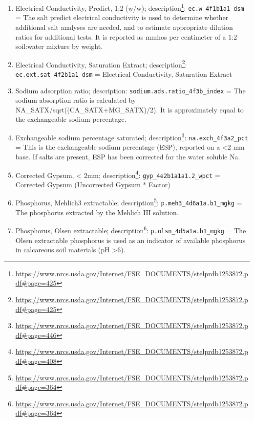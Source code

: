 \documentclass[
  graybox,natbib,nospthms]{svmono}
\renewcommand{\href}[2]{#2 (\url{#1})}
\renewcommand{\href}[2]{#2\footnote{\url{#1}}}
\begin{document}
\begin{enumerate}
  Soil pH 1:2 0.01-M calcium choride; \href{https://www.nrcs.usda.gov/Internet/FSE_DOCUMENTS/stelprdb1253872.pdf\#page=304}{description}: \texttt{ph.cacl2\_4c1a2a2a.b1\_index} = The pH, 1:2 soil-CaCl2 is the pH of a sample measured in 0.01M CaCl2 at a 1:2 soil:solution ratio.\\
\item
  Electrical Conductivity, Predict, 1:2 (w/w); \href{https://www.nrcs.usda.gov/Internet/FSE_DOCUMENTS/stelprdb1253872.pdf\#page=425}{description}: \texttt{ec.w\_4f1b1a1\_dsm} = The salt predict electrical conductivity is used to determine whether additional salt analyses are needed, and to estimate appropriate dilution ratios for additional tests. It is reported as mmhos per centimeter of a 1:2 soil:water mixture by weight.\\
\item
  Electrical Conductivity, Saturation Extract; \href{https://www.nrcs.usda.gov/Internet/FSE_DOCUMENTS/stelprdb1253872.pdf\#page=425}{description}: \texttt{ec.ext.sat\_4f2b1a1\_dsm} = Electrical Conductivity, Saturation Extract
\item
  Sodium adsorption ratio; description: \texttt{sodium.ads.ratio\_4f3b\_index} = The sodium absorption ratio is calculated by NA\_SATX/sqrt((CA\_SATX+MG\_SATX)/2). It is approximately equal to the exchangeable sodium percentage.\\
\item
  Exchangeable sodium percentage saturated; \href{https://www.nrcs.usda.gov/Internet/FSE_DOCUMENTS/stelprdb1253872.pdf\#page=446}{description}: \texttt{na.exch\_4f3a2\_pct} = This is the exchangeable sodium percentage (ESP), reported on a \textless2 mm base. If salts are present, ESP has been corrected for the water soluble Na.\\
\item
  Corrected Gypsum, \textless{} 2mm; \href{https://www.nrcs.usda.gov/Internet/FSE_DOCUMENTS/stelprdb1253872.pdf\#page=408}{description}: \texttt{gyp\_4e2b1a1a1.2\_wpct} = Corrected Gypsum (Uncorrected Gypsum * Factor)\\
\item
  Phosphorus, Mehlich3 extractable; \href{https://www.nrcs.usda.gov/Internet/FSE_DOCUMENTS/stelprdb1253872.pdf\#page=364}{description}: \texttt{p.meh3\_4d6a1a.b1\_mgkg} = The phosphorus extracted by the Mehlich III solution.\\
\item
  Phosphorus, Olsen extractable; \href{https://www.nrcs.usda.gov/Internet/FSE_DOCUMENTS/stelprdb1253872.pdf\#page=364}{description}: \texttt{p.olsn\_4d5a1a.b1\_mgkg} = The Olsen extractable phosphorus is used as an indicator of available phosphorus in calcareous soil materials (pH \textgreater6).
\end{enumerate}
\end{document}

